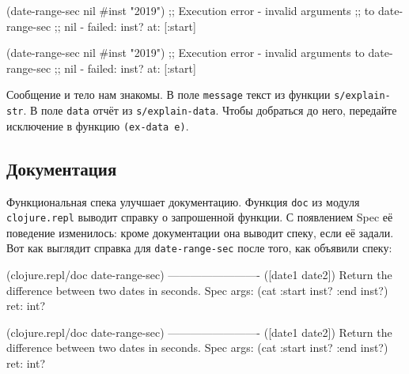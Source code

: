 \ifx\DEVICETYPE\MOBILE

\begin{english}
  \begin{clojure}
(date-range-sec nil #inst "2019")
;; Execution error - invalid arguments
;; to date-range-sec
;; nil - failed: inst? at: [:start]
  \end{clojure}
\end{english}

\else

\begin{english}
  \begin{clojure}
(date-range-sec nil #inst "2019")
;; Execution error - invalid arguments to date-range-sec
;; nil - failed: inst? at: [:start]
  \end{clojure}
\end{english}

\fi


Сообщение и тело нам знакомы. В поле \verb|message| текст из функции
\verb|s/explain-str|. В поле \verb|data| отчёт из
\verb|s/explain-data|. Чтобы добраться до него, передайте исключение в функцию
\verb|(ex-data e)|.

\subsection{Документация}


Функциональная спека улучшает документацию. Функция \verb|doc| из модуля
\verb|clojure.repl| выводит справку о запрошенной функции. С появлением Spec
её поведение изменилось: кроме документации она выводит спеку, если её
задали. Вот как выглядит справка для \verb|date-range-sec| после того, как
объявили спеку:

\ifx\DEVICETYPE\MOBILE

\begin{english}
  \begin{clojure}
(clojure.repl/doc date-range-sec)
-------------------------
([date1 date2])
  Return the difference
            between two dates in seconds.
Spec
  args: (cat :start inst? :end inst?)
  ret: int?
  \end{clojure}
\end{english}

\else

\begin{english}
  \begin{clojure}
(clojure.repl/doc date-range-sec)
-------------------------
([date1 date2])
  Return the difference between two dates in seconds.
Spec
  args: (cat :start inst? :end inst?)
  ret: int?
  \end{clojure}
\end{english}

